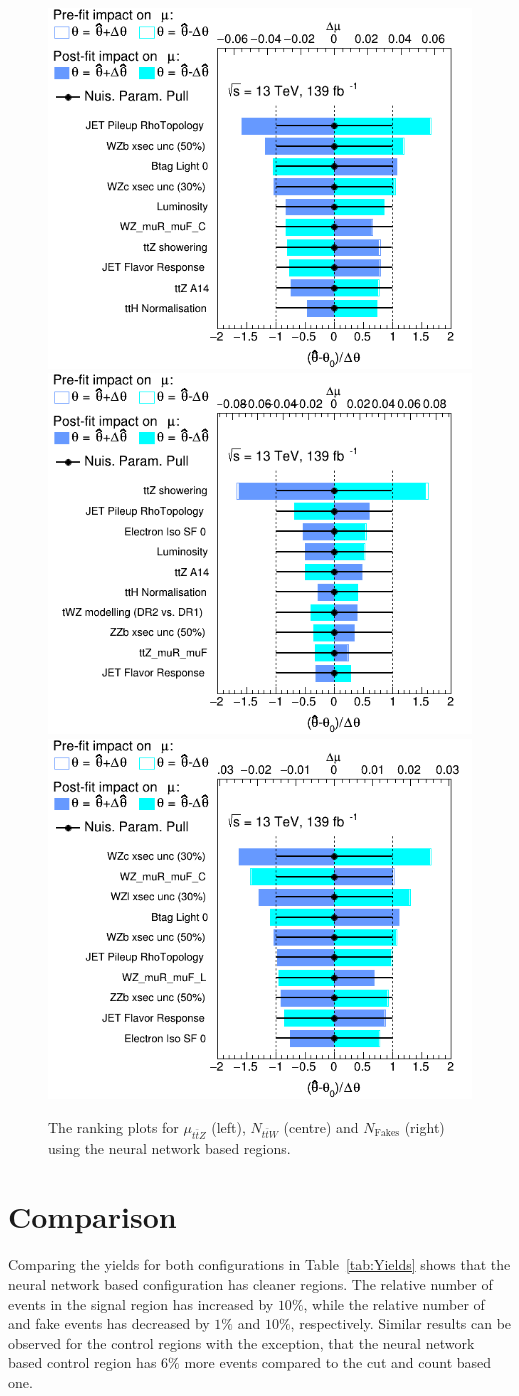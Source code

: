 \documentclass[bachelor,oneside, BCOR10mm,
			ngerman,english  %
]{GAUBM}
\begin{document}
\begin{figure}
	\centering
	\includegraphics[width=.32\textwidth]{figures/final_config/ranking/RankingSysts_mu_ttZ_systs.png}
	\includegraphics[width=.32\textwidth]{figures/final_config/ranking/RankingSysts_N_ttW_systs.png}
	\includegraphics[width=.32\textwidth]{figures/final_config/ranking/RankingSysts_N_Fakes_systs.png}
	
	\caption{The ranking plots for $\mu_{t\bar{t}Z}$ (left), $N_{t\bar{t}W}$ (centre) and $N_\text{Fakes}$ (right) using the neural network based regions.}
	\label{fig:FinalRankingPlots}
\end{figure}

\section*{Comparison}
Comparing the yields for both configurations in Table~\ref{tab:Yields} shows that the neural network based configuration has cleaner regions. The relative number of \ttbarZ events in the signal region has increased by $10\%$, while the relative number of \ttbarW and fake events has decreased by $1\%$ and $10\%$, respectively. Similar results can be observed for the control regions with the exception, that the neural network based \ttbarW control region has $6\%$ more \ttbarZ events compared to the cut and count based one. 
\end{document}
